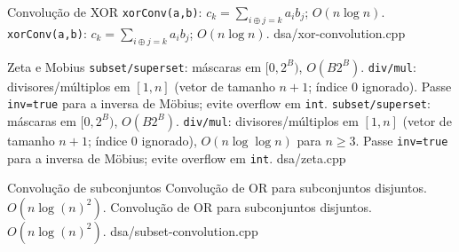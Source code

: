 \templateentry
{Convolução de XOR}
{\texttt{xorConv(a,b)}: $c_k=\sum_{i\oplus j=k}a_i b_j$; $O(n\log n)$.}
{\texttt{xorConv(a,b)}: $c_k=\sum_{i\oplus j=k}a_i b_j$; $O(n\log n)$.}
{dsa/xor-convolution.cpp}

\templateentry
{Zeta e Mobius}
{\texttt{subset/superset}: máscaras em $[0,2^B)$, $O(B2^B)$. \texttt{div/mul}: divisores/múltiplos em $[1,n]$ (vetor de tamanho $n+1$; índice 0 ignorado). Passe \texttt{inv=true} para a inversa de Möbius; evite overflow em \texttt{int}.}
{\texttt{subset/superset}: máscaras em $[0,2^B)$, $O(B2^B)$. \texttt{div/mul}: divisores/múltiplos em $[1,n]$ (vetor de tamanho $n+1$; índice 0 ignorado), $O(n\log\log n)$ para $n\ge3$. Passe \texttt{inv=true} para a inversa de Möbius; evite overflow em \texttt{int}.}
{dsa/zeta.cpp}

\templateentry
{Convolução de subconjuntos}
{Convolução de OR para subconjuntos disjuntos. $O(n \log(n)^2)$.}
{Convolução de OR para subconjuntos disjuntos. $O(n \log(n)^2)$.}
{dsa/subset-convolution.cpp}
